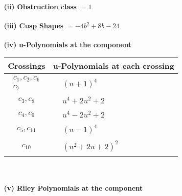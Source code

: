 \documentclass[1p]{elsarticle_modified}
\theoremstyle{definition}
\begin{document}
\flushleft \textbf{(ii) Obstruction class $= 1$}\\~\\
\flushleft \textbf{(iii) Cusp Shapes $= -4 b^2+8 b-24$}\\~\\
\newpage\renewcommand{\arraystretch}{1}
\flushleft \textbf{(iv) u-Polynomials at the component}\newline \\
\begin{tabular}{m{50pt}|m{274pt}}
Crossings & \hspace{64pt}u-Polynomials at each crossing \\
\hline $$\begin{aligned}c_{1},c_{2},c_{6}\\c_{7}\end{aligned}$$&$\begin{aligned}
&(u+1)^4
\end{aligned}$\\
\hline $$\begin{aligned}c_{3},c_{8}\end{aligned}$$&$\begin{aligned}
&u^4+2 u^2+2
\end{aligned}$\\
\hline $$\begin{aligned}c_{4},c_{9}\end{aligned}$$&$\begin{aligned}
&u^4-2 u^2+2
\end{aligned}$\\
\hline $$\begin{aligned}c_{5},c_{11}\end{aligned}$$&$\begin{aligned}
&(u-1)^4
\end{aligned}$\\
\hline $$\begin{aligned}c_{10}\end{aligned}$$&$\begin{aligned}
&(u^2+2 u+2)^2
\end{aligned}$\\
\hline
\end{tabular}\\~\\
\newpage\renewcommand{\arraystretch}{1}
\flushleft \textbf{(v) Riley Polynomials at the component}\newline \\
\end{document}
